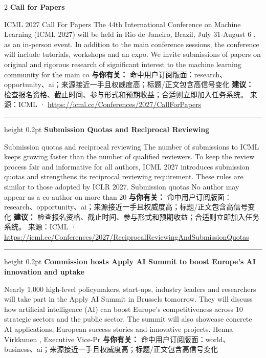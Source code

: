 \documentclass[10.5pt]{ctexart}
\begin{document}
\begin{multicols}{2}
{\large\bfseries Call for Papers}\par
ICML 2027 Call For Papers The 44th International Conference on Machine Learning (ICML 2027) will be held in Rio de Janeiro, Brazil, July 31-August 6 , as an in-person event. In addition to the main conference sessions, the conference will include tutorials, workshops and an expo. We invite submissions of papers on original and rigorous research of significant interest to the machine learning community for the main co
\textbf{与你有关：} 命中用户订阅版面：research、opportunity、ai；来源接近一手且权威度高；标题/正文包含高信号变化
\textbf{建议：} 检查报名资格、截止时间、参与形式和预期收益；合适则立即加入任务系统。
{\footnotesize\color{ormuted} 来源：ICML · \url{https://icml.cc/Conferences/2027/CallForPapers}}
\vspace{2mm}
\hrule height 0.2pt
\vspace{2mm}
{\large\bfseries Submission Quotas and Reciprocal Reviewing}\par
Submission quotas and reciprocal reviewing The number of submissions to ICML keeps growing faster than the number of qualified reviewers. To keep the review process fair and informative for all authors, ICML 2027 introduces submission quotas and strengthens its reciprocal reviewing requirement. These rules are similar to those adopted by ICLR 2027. Submission quotas No author may appear as a co-author on more than 20
\textbf{与你有关：} 命中用户订阅版面：research、opportunity、ai；来源接近一手且权威度高；标题/正文包含高信号变化
\textbf{建议：} 检查报名资格、截止时间、参与形式和预期收益；合适则立即加入任务系统。
{\footnotesize\color{ormuted} 来源：ICML · \url{https://icml.cc/Conferences/2027/ReciprocalReviewingAndSubmissionQuotas}}
\vspace{2mm}
\hrule height 0.2pt
\vspace{2mm}
{\large\bfseries Commission hosts Apply AI Summit to boost Europe’s AI innovation and uptake}\par
Nearly 1,000 high-level policymakers, start-ups, industry leaders and researchers will take part in the Apply AI Summit in Brussels tomorrow. They will discuss how artificial intelligence (AI) can boost Europe’s competitiveness across 10 strategic sectors and the public sector. The summit will also showcase concrete AI applications, European success stories and innovative projects. Henna Virkkunen , Executive Vice-Pr
\textbf{与你有关：} 命中用户订阅版面：world、business、ai；来源接近一手且权威度高；标题/正文包含高信号变化

\end{multicols}
\end{document}
